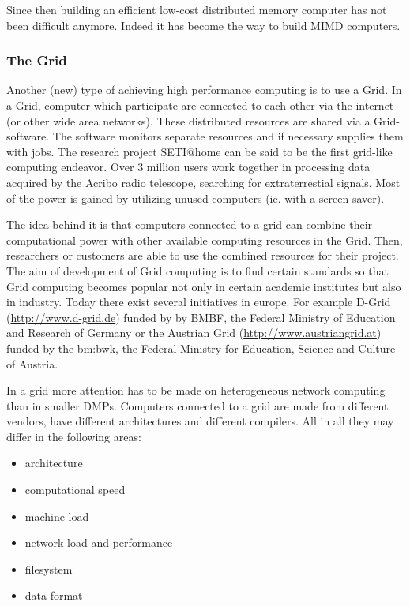 Since then building an efficient low-cost distributed memory computer
has not been difficult anymore. Indeed it has become the way to build
MIMD computers.

\subsubsection{The Grid}

Another (new) type of achieving high performance computing is to use a
Grid. In a Grid, computer which participate are connected to each other
via the internet (or other wide area networks). These distributed
resources are shared via a 
Grid-software. The software monitors separate resources and if
necessary supplies them with jobs. The research project SETI@home can
be said to be the first grid-like computing endeavor. Over 3 million
users work together in processing data acquired by the Acribo radio
telescope, searching for extraterrestial signals. Most of the power is
gained by utilizing unused computers (ie. with a screen saver).

The idea behind it is that computers connected to a grid can combine
their computational power with other available computing resources in the
Grid. Then, researchers or customers are able to use the combined
resources for their project. The aim of development of Grid computing
is to find certain standards so that Grid computing becomes popular
not only in certain academic institutes but also in industry. Today
there exist several initiatives in europe. For example D-Grid
(\url{http://www.d-grid.de}) funded
by by BMBF, the Federal Ministry of Education and Research of Germany
or the Austrian Grid (\url{http://www.austriangrid.at}) funded by the
bm:bwk, the Federal Ministry for Education, Science and Culture of
Austria.

In a grid more attention has to be made on heterogeneous network
computing than in smaller DMPs. Computers connected to a grid are made
from different vendors, have different architectures and different
compilers. All in all they may differ in the following areas:

\begin{itemize}
\item architecture
\item computational speed
\item machine load
\item network load and performance
\item filesystem
\item data format
\end{itemize}

